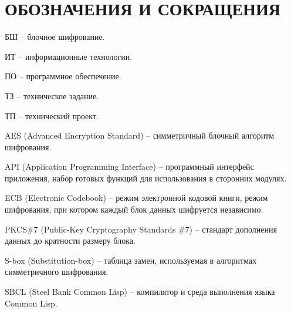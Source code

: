 \section*{ОБОЗНАЧЕНИЯ И СОКРАЩЕНИЯ}

БШ -- блочное шифрование.

ИТ -- информационные технологии. 

ПО -- программное обеспечение.

ТЗ -- техническое задание.

ТП -- технический проект.

AES (Advanced Encryption Standard) -- симметричный блочный алгоритм шифрования.

API (Application Programming Interface) -- программный интерфейс приложения, набор готовых функций для использования в сторонних модулях.

ECB (Electronic Codebook) -- режим электронной кодовой книги, режим шифрования, при котором каждый блок данных шифруется независимо.

PKCS\#7 (Public-Key Cryptography Standards \#7) -- стандарт дополнения данных до кратности размеру блока.

S-box (Substitution-box) -- таблица замен, используемая в алгоритмах симметричного шифрования.

SBCL (Steel Bank Common Lisp) -- компилятор и среда выполнения языка Common Lisp.